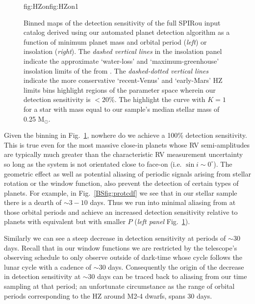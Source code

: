 \begin{figure}
\begin{ocg}{fig:HZon}{fig:HZon}{1}
  \end{ocg}
  \hspace{-\hsize}%
  \caption[Detection sensitivity maps in the SLS-PS.]
      {\small Binned maps of the detection sensitivity of the full SPIRou input catalog derived using our
    automated planet detection algorithm as a function of minimum planet mass and orbital period 
    (\emph{left}) or insolation (\emph{right}). The \emph{dashed vertical lines} in the
    insolation panel indicate the approximate `water-loss' and `maximum-greenhouse' insolation
    limits of the  from \cite{kopparapu13}.
    The \emph{dashed-dotted vertical lines}
    indicate the more conservative `recent-Venus' and `early-Mars' HZ limits \citep{kopparapu13}
     bins highlight
    regions of the parameter space wherein our detection sensitivity is $<20$\%. The
     highlight the curve with $K=1$
    \mps{} for a star with mass equal to our sample's median stellar mass of 0.25 M$_{\odot}$.}
  \label{BSfig:sensitivity}
\end{figure}


Given the binning in Fig.~\ref{BSfig:sensitivity}, nowhere do we achieve a 100\%
detection sensitivity. This is true even for the most massive close-in planets whose RV
semi-amplitudes are typically much greater than the characteristic RV measurement uncertainty so
long as the system is not orientated close to face-on (i.e. $\sin{i} \sim 0^{\circ}$). The geometric effect
as well as potential aliasing of periodic signals arising from stellar rotation or the window
function, also prevent the detection of certain types of planets. For example, in Fig.~\ref{BSfig:protcdf}
we see that in our stellar sample there is a dearth of \prot{} $\sim 3-10$ days. Thus
we run into minimal aliasing from \prot{} at those orbital periods and achieve an increased detection
sensitivity relative to planets with equivalent \msini{} but with smaller $P$
(\emph{left panel} Fig.~\ref{BSfig:sensitivity}).

Similarly we can see a steep decrease in detection sensitivity at periods of $\sim 30$ days. Recall that
in our window functions we are restricted by the telescope's observing schedule to only observe outside
of dark-time whose cycle follows the lunar cycle with a cadence of  $\sim 30$ days.
Consequently the origin of the
decrease in detection sensitivity at $\sim 30$ days can be traced back to aliasing from our time
sampling at that period; an unfortunate circumstance as the range of orbital periods corresponding to the
HZ around M2-4 dwarfs, spans 30 days. 

